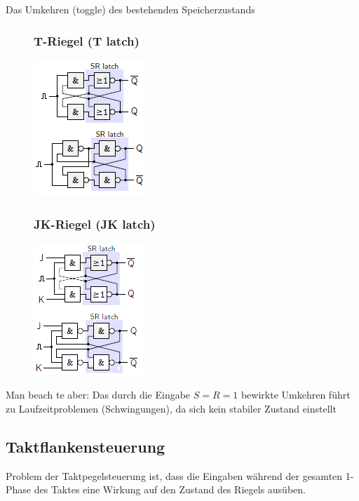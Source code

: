 \documentclass[12pt]{report}
\begin{document}
Das Umkehren (toggle) des bestehenden Speicherzustands

\begin{figure}[H]
  \begin{minipage}[t]{0.45\textwidth}
    \subsubsection{T-Riegel (T latch)}
    \centering    
    \includegraphics{riegel_t-riegel}
  \end{minipage}
  \hfill
  \begin{minipage}[t]{0.45\textwidth}
    \subsubsection{JK-Riegel (JK latch)}
    \centering    
    \includegraphics{riegel_jk-riegel}
  \end{minipage}
\end{figure}

\begin{warnbox}
  Man beach   te aber: Das durch die Eingabe $S=R=1$ bewirkte Umkehren führt 
  zu Laufzeitproblemen (Schwingungen), da sich kein stabiler Zustand einstellt
\end{warnbox}


\subsection{Taktflankensteuerung}
Problem der Taktpegelsteuerung ist, dass die Eingaben während der gesamten 1-Phase des Taktes eine Wirkung auf den Zustand des Riegels ausüben.
\end{document}

